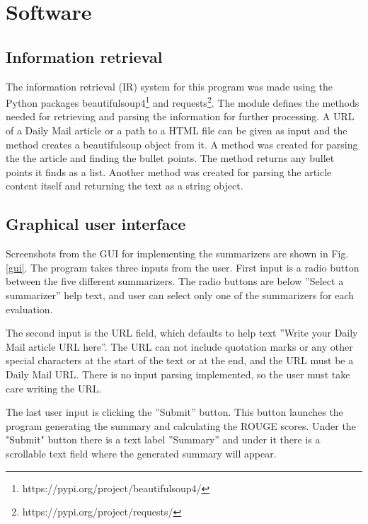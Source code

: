 \documentclass[conference]{IEEEtran}
\begin{document}
\section{Software}\label{implementation} 
\begin{figure*}[!t]
	\centering
	\hfill
	\caption{The GUI for summarizers.}
	\label{gui} 
\end{figure*}
\subsection{Information retrieval}
The information retrieval (IR) system for this program was made using the Python packages beautifulsoup4\footnote{https://pypi.org/project/beautifulsoup4/} and requests\footnote{https://pypi.org/project/requests/}. The module defines the methods needed for retrieving and parsing the information for further processing. A URL of a Daily Mail article or a path to a HTML file can be given as input and the method creates a beautifulsoup object from it. A method was created for parsing the the article and finding the bullet points. The method returns any bullet points it finds as a list. Another method was created for parsing the article content itself and returning the text as a string object. 

\subsection{Graphical user interface}
Screenshots from the GUI for implementing the summarizers are shown in Fig. \ref{gui}. The program takes three inputs from the user. First input is a radio button between the five different summarizers. The radio buttons are below ”Select a summarizer” help text, and user can select only one of the summarizers for each evaluation. 

The second input is the URL field, which defaults to help text ”Write your Daily Mail article URL here”. The URL can not include quotation marks or any other special characters at the start of the text or at the end, and the URL must be a Daily Mail URL. There is no input parsing implemented, so the user must take care writing the URL.

The last user input is clicking the ”Submit” button. This button launches the program generating the summary and calculating the ROUGE scores. Under the "Submit" button there is a text label ”Summary” and under it there is a scrollable text field where the generated summary will appear.
\end{document}
